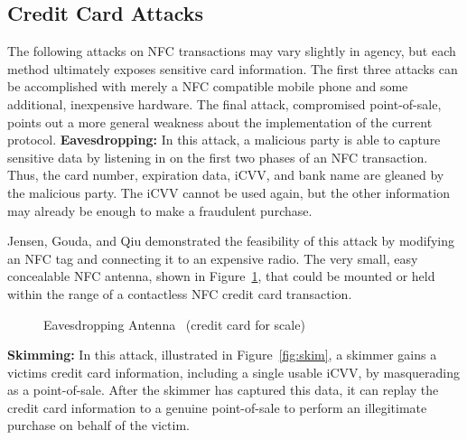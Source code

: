 \documentclass{sig-alternate}
\begin{document}
\subsection{Credit Card Attacks}
\label{sec:attacks}
The following attacks on NFC transactions may vary slightly in agency, but each method ultimately exposes sensitive card information. The first three attacks can be accomplished with merely a NFC compatible mobile phone and some additional, inexpensive hardware. The final attack, compromised point-of-sale, points out a more general weakness about the implementation of the current protocol.
\vspace{2mm}\newline
\noindent\textbf{Eavesdropping:}
In this attack, a malicious party is able to capture sensitive data by listening in on the first two phases of an NFC transaction. Thus, the card number, expiration data, iCVV, and bank name are gleaned by the malicious party. The iCVV cannot be used again, but the other information may already be enough to make a fraudulent purchase.

Jensen, Gouda, and Qiu demonstrated the feasibility of this attack by modifying an NFC tag and connecting it to an expensive radio. The very small, easy concealable NFC antenna, shown in Figure~\ref{fig:antenna}, that could be mounted or held within the range of a contactless NFC credit card transaction.
\begin{figure}
\centering
{}
\caption{Eavesdropping Antenna~\cite{CC2016} \newline(credit card for scale)}
\label{fig:antenna}
\end{figure}
\vspace{2mm}\newline
\noindent\textbf{Skimming:}
In this attack, illustrated in Figure~\ref{fig:skim}, a skimmer gains a victims credit card information, including a single usable iCVV, by masquerading as a point-of-sale. After the skimmer has captured this data, it can replay the credit card information to a genuine point-of-sale to perform an illegitimate purchase on behalf of the victim.
\end{document}
